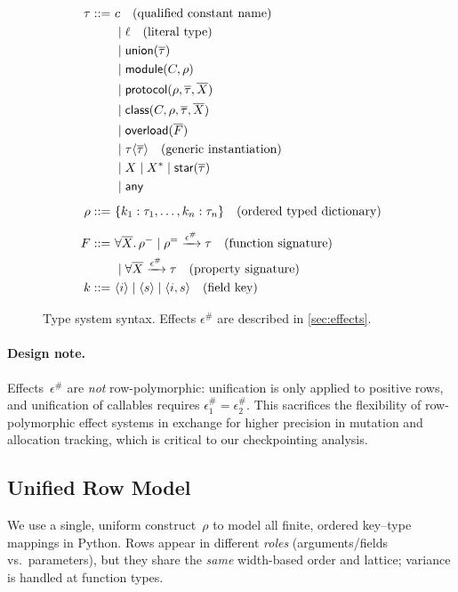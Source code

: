 \begin{figure}[t]
\centering
\begin{align*}
\tau ::=~& c \quad\text{(qualified constant name)} \\
 & \mid \ell \quad\text{(literal type)} \\
 & \mid \mathsf{union}(\overline{\tau}) \\
 & \mid \mathsf{module}(C, \mathord{\rho}) \\
 & \mid \mathsf{protocol}(\mathord{\rho}, \overline{\tau}, \overline{X}) \\
 & \mid \mathsf{class}(C, \mathord{\rho}, \overline{\tau}, \overline{X}) \\
 & \mid \mathsf{overload}(\overline{F}) \\
 & \mid \tau\langle\overline{\tau}\rangle \quad\text{(generic instantiation)} \\
 & \mid X \mid X^* \mid \mathsf{star}(\overline{\tau}) \\
 & \mid \mathsf{any}
\\[0.5em]
\mathord{\rho} ::=~& \{ k_1 : \tau_1, \ldots, k_n : \tau_n \} \quad\text{(ordered typed dictionary)}
\\[0.5em]
F ::=~& \forall \overline{X}.\,\mathord{\rho^{-}} \mid \mathord{\rho^{=}} \xrightarrow{\epsilon^\#} \tau
\quad\text{(function signature)}\\
 & \mid \forall \overline{X}\xrightarrow{\epsilon^\#} \tau \quad\text{(property signature)}
\\
k ::=~& \langle i\rangle \mid \langle s\rangle \mid \langle i, s\rangle
\quad\text{(field key)}
\end{align*}
\caption{Type system syntax. Effects $\epsilon^\#$ are described in \cref{sec:effects}.}
\label{fig:type-syntax}
\end{figure}

\paragraph{Design note.}
Effects~$\epsilon^\#$ are \emph{not} row-polymorphic: unification is only applied to positive rows, and unification of callables requires $\epsilon^\#_1 = \epsilon^\#_2$.  
This sacrifices the flexibility of row-polymorphic effect systems in exchange for higher precision in mutation and allocation tracking, which is critical to our checkpointing analysis.

\subsection{Unified Row Model}
\label{sec:unified-record}
We use a single, uniform construct~$\rho$ to model all finite, ordered key--type mappings in Python.
Rows appear in different \emph{roles} (arguments/fields vs.\ parameters), but they share the \emph{same} width-based order and lattice; variance is handled at function types.

